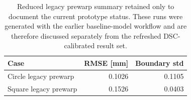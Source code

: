 \begin{table}[tb]
\centering
\caption{Reduced legacy prewarp summary retained only to document the current prototype status. These runs were generated with the earlier baseline-model workflow and are therefore discussed separately from the refreshed DSC-calibrated result set.}
\label{tab:prewarp_refresh}
\small
\begin{tabular}{lrr}
\toprule
Case & RMSE [mm] & Boundary std \\
\midrule
Circle legacy prewarp & 0.1026 & 0.1105 \\
Square legacy prewarp & 0.1526 & 0.0403 \\
\bottomrule
\end{tabular}
\end{table}
